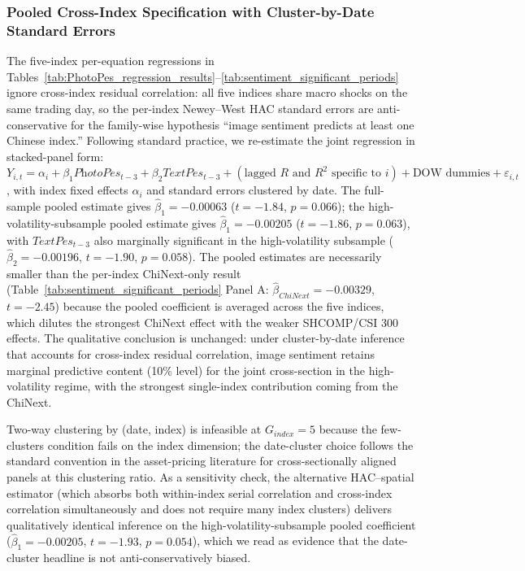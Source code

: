 \documentclass[AER]{AEA}
\begin{document}
\subsubsection{Pooled Cross-Index Specification with Cluster-by-Date Standard Errors}
\label{sec:pooled_cluster}

The five-index per-equation regressions in Tables~\ref{tab:PhotoPes_regression_results}--\ref{tab:sentiment_significant_periods} ignore cross-index residual correlation: all five indices share macro shocks on the same trading day, so the per-index Newey--West HAC standard errors are anti-conservative for the family-wise hypothesis ``image sentiment predicts at least one Chinese index.'' Following standard practice, we re-estimate the joint regression in stacked-panel form: $Y_{i,t} = \alpha_i + \beta_1 \textit{PhotoPes}_{t-3} + \beta_2 \textit{TextPes}_{t-3} + (\text{lagged } R \text{ and } R^2 \text{ specific to } i) + \text{DOW dummies} + \varepsilon_{i,t}$, with index fixed effects $\alpha_i$ and standard errors clustered by date. The full-sample pooled estimate gives $\hat\beta_1 = -0.00063$ ($t=-1.84$, $p=0.066$); the high-volatility-subsample pooled estimate gives $\hat\beta_1 = -0.00205$ ($t=-1.86$, $p=0.063$), with $\textit{TextPes}_{t-3}$ also marginally significant in the high-volatility subsample ($\hat\beta_2 = -0.00196$, $t=-1.90$, $p=0.058$). The pooled estimates are necessarily smaller than the per-index ChiNext-only result (Table~\ref{tab:sentiment_significant_periods} Panel A: $\hat\beta_{ChiNext} = -0.00329$, $t=-2.45$) because the pooled coefficient is averaged across the five indices, which dilutes the strongest ChiNext effect with the weaker SHCOMP/CSI 300 effects. The qualitative conclusion is unchanged: under cluster-by-date inference that accounts for cross-index residual correlation, image sentiment retains marginal predictive content (10\% level) for the joint cross-section in the high-volatility regime, with the strongest single-index contribution coming from the ChiNext.

Two-way clustering by (date, index) is infeasible at $G_{index}=5$ because the few-clusters condition fails on the index dimension; the date-cluster choice follows the standard convention in the asset-pricing literature for cross-sectionally aligned panels at this clustering ratio. As a sensitivity check, the alternative \citet{driscollkraay1998consistent} HAC--spatial estimator (which absorbs both within-index serial correlation and cross-index correlation simultaneously and does not require many index clusters) delivers qualitatively identical inference on the high-volatility-subsample pooled coefficient ($\hat\beta_1=-0.00205$, $t=-1.93$, $p=0.054$), which we read as evidence that the date-cluster headline is not anti-conservatively biased.
\end{document}
